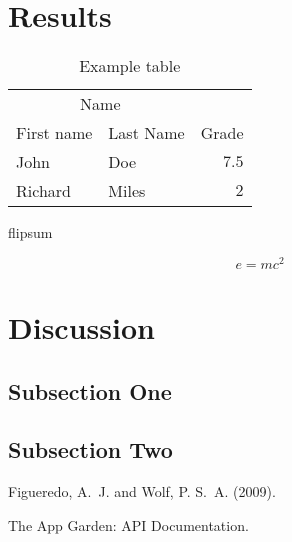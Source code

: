 \documentclass[twoside]{article}
\begin{document}
\begin{multicols}{2}

\section{Results}

\begin{table}[H]
\caption{Example table}
\centering
\begin{tabular}{llr}
\toprule
\multicolumn{2}{c}{Name} \\
\cmidrule(r){1-2}
First name & Last Name & Grade \\
\midrule
John & Doe & $7.5$ \\
Richard & Miles & $2$ \\
\bottomrule
\end{tabular}
\end{table}
flipsum

\begin{equation}
\label{eq:emc}
e = mc^2
\end{equation}



\section{Discussion}

\subsection{Subsection One}


\subsection{Subsection Two}



\begin{thebibliography}{99} %

Figueredo, A.~J. and Wolf, P. S.~A. (2009).

The App Garden: API Documentation.
\end{thebibliography}


\end{multicols}
\end{document}

